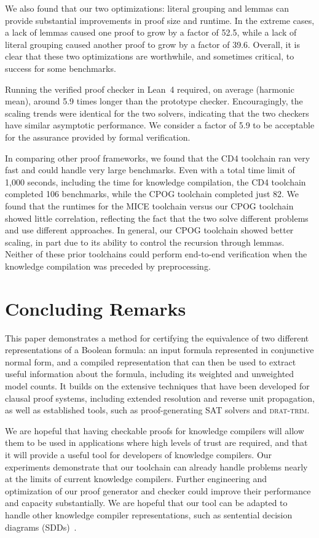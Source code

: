 \documentclass[twoside,11pt]{article}
\newcommand{\progname}[1]{\textsc{#1}}
\newcommand{\cdfour}{\progname{CD4}}
\newcommand{\dtrim}{\progname{drat-trim}}
\newcommand{\lean}{Lean~4}
\begin{document}
We also found that our two optimizations: literal grouping and
lemmas can provide substantial improvements in proof size and runtime.
In the extreme cases, a lack
of lemmas caused one proof to grow by a factor of 52.5, while a lack
of literal grouping caused another proof to grow by a factor of 39.6.
Overall, it is clear that these two optimizations are worthwhile, and
sometimes critical, to success for some benchmarks.

Running the verified proof checker in \lean{} required, on average
(harmonic mean), around 5.9 times longer than the prototype checker.
Encouragingly, the scaling trends were identical for the two solvers,
indicating that the two checkers have similar asymptotic performance.
We consider a factor of 5.9 to be acceptable for the assurance
provided by formal verification.

In comparing other proof frameworks, we found that the \cdfour{}
toolchain ran very fast and could handle very large benchmarks.  Even
with a total time limit of 1,000 seconds, including the time for
knowledge compilation, the \cdfour{} toolchain completed 106
benchmarks, while the CPOG toolchain completed just 82.  We found
that the runtimes for the MICE toolchain versus our CPOG toolchain
showed little correlation, reflecting the fact that the two solve
different problems and use different approaches.  In general, our CPOG
toolchain showed better scaling, in part due to its ability to control
the recursion through lemmas.  Neither of these prior
toolchains could perform end-to-end verification when the knowledge
compilation was preceded by preprocessing.

\section{Concluding Remarks}
\label{sect:future}

This paper demonstrates a method for certifying the equivalence of two
different representations of a Boolean formula: an input formula
represented in conjunctive normal form, and a compiled representation
that can then be used to extract useful information about the formula,
including its weighted and unweighted model counts.  It builds on the
extensive techniques that have been developed for clausal
proof systems, including extended resolution and reverse unit propagation, as well as established tools, such as
proof-generating SAT solvers and \dtrim{}.


We are hopeful that having checkable proofs for knowledge compilers
will allow them to be used in applications where high levels of trust
are required, and that it will provide a useful tool for developers of
knowledge compilers.
Our experiments demonstrate that our toolchain can already handle
problems nearly at the limits of current knowledge compilers.  Further
engineering and optimization of our proof generator and checker could
improve their performance and capacity substantially.  We are hopeful
that our tool can be adapted to handle other knowledge compiler
representations, such as sentential decision diagrams (SDDs)~\cite{darwiche:ijcai:2011}.
\end{document}
